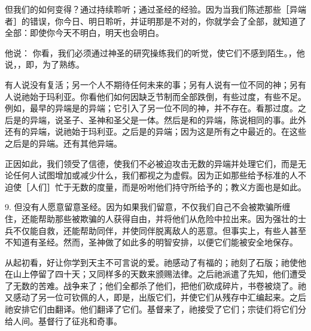 但我们的如何变得？通过持续聆听；通过圣经的经验。因为当我们陈述那些［异端者］的错误，你今日、明日聆听，并证明那是不对的，你就学会了全部，就知道了全部：即使你今天不明白，明天也会明白。\par

他说： 你看，我们必须通过神圣的研究操练我们的听觉，使它们不感到陌生。，他说，，即，为了熟练。\par

有人说没有复活；另一个人不期待任何未来的事；另有人说有一位不同的神；另有人说祂始于玛利亚。你看他们如何因缺乏节制而全部跌倒，有些过度，有些不足。例如，最早的异端是的异端；它引入了另一位不同的神，并不存在。看那过度。之后是的异端，说圣子、圣神和圣父是一体。然后是和的异端，陈说相同的事。此外还有的异端，说祂始于玛利亚。之后是的异端；因为这是所有之中最近的。在这些之后是的异端。还有其他异端。\par

正因如此，我们领受了信德，使我们不必被迫攻击无数的异端并处理它们，而是无论任何人试图增加或减少什么，我们都视之为虚假。因为正如那些给予标准的人不迫使［人们］忙于无数的度量，而是吩咐他们持守所给予的；教义方面也是如此。\par

9. 但没有人愿意留意圣经。因为如果我们留意，不仅我们自己不会被欺骗所缠住，还能帮助那些被欺骗的人获得自由，并将他们从危险中拉出来。因为强壮的士兵不仅能自救，还能帮助同伴，并使同伴脱离敌人的恶意。但事实上，有些人甚至不知道有圣经。然而，圣神做了如此多的明智安排，以便它们能被安全地保存。\par

从起初看，好让你学到天主不可言说的爱。祂感动了有福的；祂刻了石版；祂使他在山上停留了四十天；又同样多的天数来颁赐法律。之后祂派遣了先知，他们遭受了无数的苦难。战争来了；他们全都杀了他们，把他们砍成碎片，书卷被烧了。祂又感动了另一位可钦佩的人，即是，出版它们，并使它们从残存中汇编起来。之后祂安排它们由翻译。他们翻译了它们。基督来了，祂接受了它们；宗徒们将它们分给人间。基督行了征兆和奇事。\par


